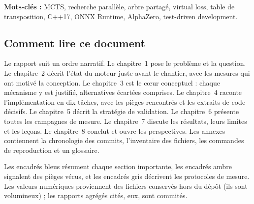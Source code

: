 \vspace{0.4cm}

\noindent\textbf{Mots-cl\'es :} MCTS, recherche parall\`ele, arbre partag\'e,
virtual loss, table de transposition, C++17, ONNX Runtime, AlphaZero,
test-driven development.

\subsection*{Comment lire ce document}

Le rapport suit un ordre narratif. Le chapitre~1 pose le probl\`eme et la
question. Le chapitre~2 d\'ecrit l'\'etat du moteur juste avant le chantier,
avec les mesures qui ont motiv\'e la conception. Le chapitre~3 est le c\oe{}ur
conceptuel : chaque m\'ecanisme y est justifi\'e, alternatives \'ecart\'ees
comprises. Le chapitre~4 raconte l'impl\'ementation en dix t\^aches, avec les
pi\`eges rencontr\'es et les extraits de code d\'ecisifs. Le chapitre~5 d\'ecrit
la strat\'egie de validation. Le chapitre~6 pr\'esente toutes les campagnes de
mesure. Le chapitre~7 discute les r\'esultats, leurs limites et les le\c{c}ons.
Le chapitre~8 conclut et ouvre les perspectives. Les annexes contiennent la
chronologie des commits, l'inventaire des fichiers, les commandes de
reproduction et un glossaire.

Les encadr\'es bleus r\'esument chaque section importante, les encadr\'es ambre
signalent des pi\`eges v\'ecus, et les encadr\'es gris d\'ecrivent les
protocoles de mesure. Les valeurs num\'eriques proviennent des fichiers
 conserv\'es hors du d\'ep\^ot (ils sont volumineux) ; les
rapports agr\'eg\'es cit\'es, eux, sont commit\'es.
